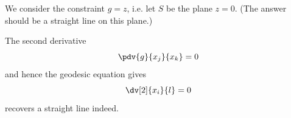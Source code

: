 \begin{example}
    We consider the constraint \(g = z\), i.e. let \(S\) be the plane \(z = 0\). (The answer should be a straight line on this plane.)

    The second derivative
    \[
        \pdv{g}{x_j}{x_k} = 0
    \]
    and hence the geodesic equation gives
    \[
        \dv[2]{x_i}{l} = 0
    \]
    recovers a straight line indeed.
\end{example}